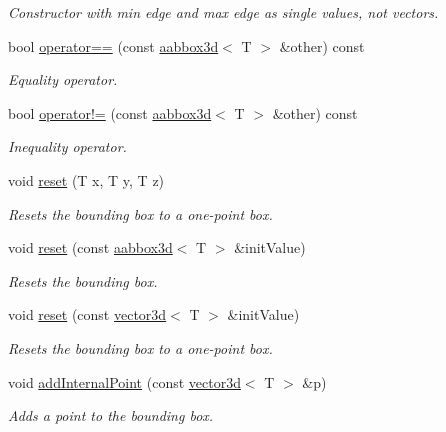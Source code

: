 \begin{DoxyCompactItemize}
\begin{DoxyCompactList}\small\item\em Constructor with min edge and max edge as single values, not vectors. \end{DoxyCompactList}\item 
bool \hyperlink{classirr_1_1core_1_1aabbox3d_a0cc0518e11f284b8a6c3b3cb0f8cc389}{operator==} (const \hyperlink{classirr_1_1core_1_1aabbox3d}{aabbox3d}$<$ T $>$ \&other) const 
\begin{DoxyCompactList}\small\item\em Equality operator. \end{DoxyCompactList}\item 
bool \hyperlink{classirr_1_1core_1_1aabbox3d_a6a8209973478e2c5bffde1259dfe95b6}{operator!=} (const \hyperlink{classirr_1_1core_1_1aabbox3d}{aabbox3d}$<$ T $>$ \&other) const 
\begin{DoxyCompactList}\small\item\em Inequality operator. \end{DoxyCompactList}\item 
void \hyperlink{classirr_1_1core_1_1aabbox3d_afc718e96ed11aa71a30311d32bfc885a}{reset} (T x, T y, T z)
\begin{DoxyCompactList}\small\item\em Resets the bounding box to a one-\/point box. \end{DoxyCompactList}\item 
void \hyperlink{classirr_1_1core_1_1aabbox3d_a5f7139087de60b4c16b5df015ade1cba}{reset} (const \hyperlink{classirr_1_1core_1_1aabbox3d}{aabbox3d}$<$ T $>$ \&init\+Value)
\begin{DoxyCompactList}\small\item\em Resets the bounding box. \end{DoxyCompactList}\item 
void \hyperlink{classirr_1_1core_1_1aabbox3d_af777a607745b2bd3f4390dfee8263944}{reset} (const \hyperlink{classirr_1_1core_1_1vector3d}{vector3d}$<$ T $>$ \&init\+Value)
\begin{DoxyCompactList}\small\item\em Resets the bounding box to a one-\/point box. \end{DoxyCompactList}\item 
void \hyperlink{classirr_1_1core_1_1aabbox3d_a49e3765fd2f40a115f8f28bd74d62ccf}{add\+Internal\+Point} (const \hyperlink{classirr_1_1core_1_1vector3d}{vector3d}$<$ T $>$ \&p)
\begin{DoxyCompactList}\small\item\em Adds a point to the bounding box. \end{DoxyCompactList}\item 

\end{DoxyCompactItemize}
